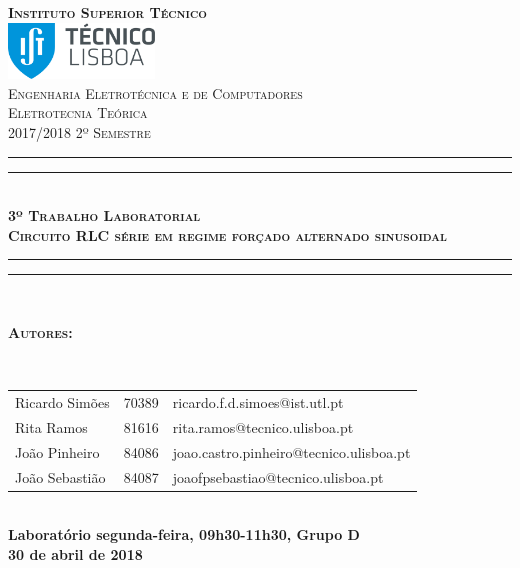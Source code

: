 \documentclass[11pt, a4paper, titlepage, portuguese]{article}
\begin{document}
	\begin{titlepage}
		\center
		\textsc{\bfseries\LARGE Instituto Superior Técnico}\\[1cm] %
		\includegraphics[height=1.5cm]{IST_Logo.pdf}\\[2.5cm]

		\textsc{\large Engenharia Eletrotécnica e de Computadores}\\[0.5cm] %
		\textsc{\Large Eletrotecnia Teórica}\\[0.5cm] %
		\textsc{\large 2017/2018 2º Semestre}\\[2cm]

		\rule{\textwidth}{1.6pt}\vspace*{-\baselineskip}\vspace*{2pt} %
		\rule{\textwidth}{0.4pt}\\[\baselineskip] %
			\textsc{\Huge \bfseries 3º Trabalho Laboratorial}\\[0.2cm]
			\bigskip
			\textsc{\large \bfseries Circuito RLC série em regime forçado alternado sinusoidal}\\[0.2cm]
		\rule{\textwidth}{0.4pt}\vspace*{-\baselineskip}\vspace{3.2pt} %
		\rule{\textwidth}{1.6pt}\\[5cm]

		\begin{minipage}{0.9\textwidth}
			\begin{flushleft} \large
				\begin{Large}\bfseries\textsc{Autores:}\end{Large}\\[0.4cm]
				\begin{tabular}{l l l}
					Ricardo Simões	& 70389 & \normalsize ricardo.f.d.simoes@ist.utl.pt \\
					Rita Ramos		& 81616 & \normalsize rita.ramos@tecnico.ulisboa.pt \\
					João Pinheiro		& 84086 & \normalsize joao.castro.pinheiro@tecnico.ulisboa.pt \\
					João Sebastião		& 84087 & \normalsize joaofpsebastiao@tecnico.ulisboa.pt \\
				\end{tabular}
			\end{flushleft}
		\end{minipage}\\[0.5cm]

		\large \bfseries Laboratório segunda-feira, 09h30-11h30, Grupo D\\
		\large 30 de abril de 2018\\[1cm]
		\setcounter{page}{0}
	\end{titlepage}
\end{document}
